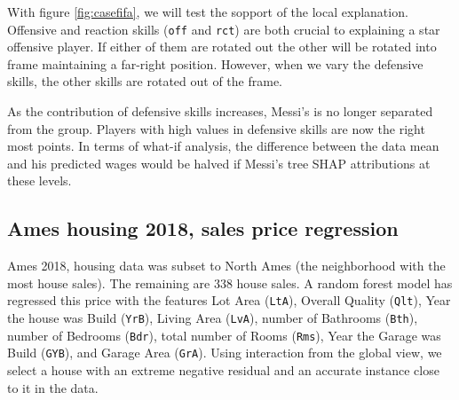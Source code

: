 \documentclass[
]{article}
\begin{document}
With figure \ref{fig:casefifa}, we will test the sopport of the local explanation. Offensive and reaction skills (\texttt{off} and \texttt{rct}) are both crucial to explaining a star offensive player. If either of them are rotated out the other will be rotated into frame maintaining a far-right position. However, when we vary the defensive skills, the other skills are rotated out of the frame.

As the contribution of defensive skills increases, Messi's is no longer separated from the group. Players with high values in defensive skills are now the right most points. In terms of what-if analysis, the difference between the data mean and his predicted wages would be halved if Messi's tree SHAP attributions at these levels.

\hypertarget{ames-housing-2018-sales-price-regression}{%
\subsection{Ames housing 2018, sales price regression}\label{ames-housing-2018-sales-price-regression}}

Ames 2018, housing data was subset to North Ames (the neighborhood with the most house sales). The remaining are 338 house sales. A random forest model has regressed this price with the features Lot Area (\texttt{LtA}), Overall Quality (\texttt{Qlt}), Year the house was Build (\texttt{YrB}), Living Area (\texttt{LvA}), number of Bathrooms (\texttt{Bth}), number of Bedrooms (\texttt{Bdr}), total number of Rooms (\texttt{Rms}), Year the Garage was Build (\texttt{GYB}), and Garage Area (\texttt{GrA}). Using interaction from the global view, we select a house with an extreme negative residual and an accurate instance close to it in the data.
\end{document}
